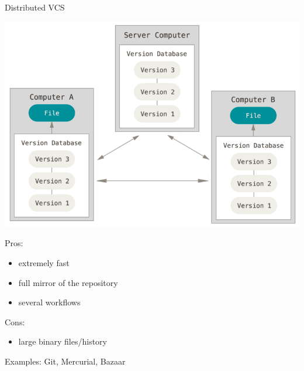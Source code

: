 \documentclass{beamer}
\begin{document}
\begin{frame}[fragile]
\begin{overprint}
    \begin{exampleblock}{Distributed VCS}
      \begin{minipage}{.5\linewidth}
        \includegraphics[width=\textwidth]{distributed}
      \end{minipage}
      \begin{minipage}{.45\linewidth}\small
        Pros:
        \begin{itemize}
          \item extremely fast
          \item full mirror of the repository
          \item several workflows
        \end{itemize}
        Cons:
        \begin{itemize}
        \item large binary files/history
        \end{itemize}
        Examples: Git, Mercurial, Bazaar
      \end{minipage}
    \end{exampleblock}

  \end{overprint}
    
\end{frame}
\end{document}
